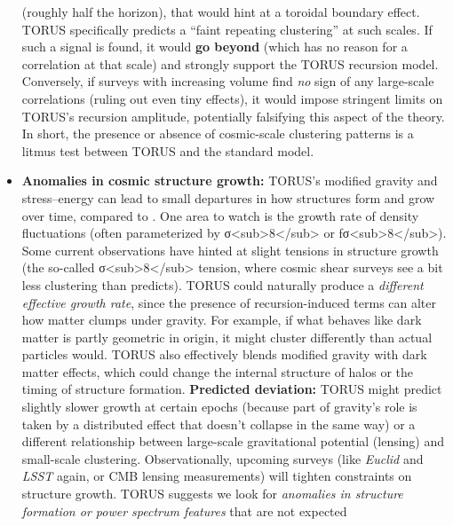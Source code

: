 \documentclass[
]{article}
\begin{document}
\begin{itemize}
  (roughly half the horizon), that would hint at a toroidal boundary
  effect\hspace{0pt}. TORUS specifically predicts a ``faint repeating
  clustering'' at such scales\hspace{0pt}. If such a signal is found, it
  would \textbf{go beyond \LambdaCDM} (which has no reason for a correlation
  at that scale) and strongly support the TORUS recursion model.
  Conversely, if surveys with increasing volume find \emph{no} sign of
  any large-scale correlations (ruling out even tiny effects), it would
  impose stringent limits on TORUS's recursion amplitude, potentially
  falsifying this aspect of the theory\hspace{0pt}. In short, the
  presence or absence of cosmic-scale clustering patterns is a litmus
  test between TORUS and the standard model.
\item
  \textbf{Anomalies in cosmic structure growth:} TORUS's modified
  gravity and stress--energy can lead to small departures in how
  structures form and grow over time, compared to \LambdaCDM. One area to
  watch is the growth rate of density fluctuations (often parameterized
  by σ\textless sub\textgreater8\textless/sub\textgreater{} or
  fσ\textless sub\textgreater8\textless/sub\textgreater). Some current
  observations have hinted at slight tensions in structure growth (the
  so-called σ\textless sub\textgreater8\textless/sub\textgreater{}
  tension, where cosmic shear surveys see a bit less clustering than
  \LambdaCDM predicts). TORUS could naturally produce a \emph{different
  effective growth rate}, since the presence of recursion-induced terms
  can alter how matter clumps under gravity. For example, if what
  behaves like dark matter is partly geometric in origin, it might
  cluster differently than actual particles would. TORUS also
  effectively blends modified gravity with dark matter effects, which
  could change the internal structure of halos or the timing of
  structure formation. \textbf{Predicted deviation:} TORUS might predict
  slightly slower growth at certain epochs (because part of gravity's
  role is taken by a distributed effect that doesn't collapse in the
  same way) or a different relationship between large-scale
  gravitational potential (lensing) and small-scale clustering.
  Observationally, upcoming surveys (like \emph{Euclid} and \emph{LSST}
  again, or CMB lensing measurements) will tighten constraints on
  structure growth. TORUS suggests we look for \emph{anomalies in
  structure formation or power spectrum features} that are not expected

\end{itemize}
\end{document}
